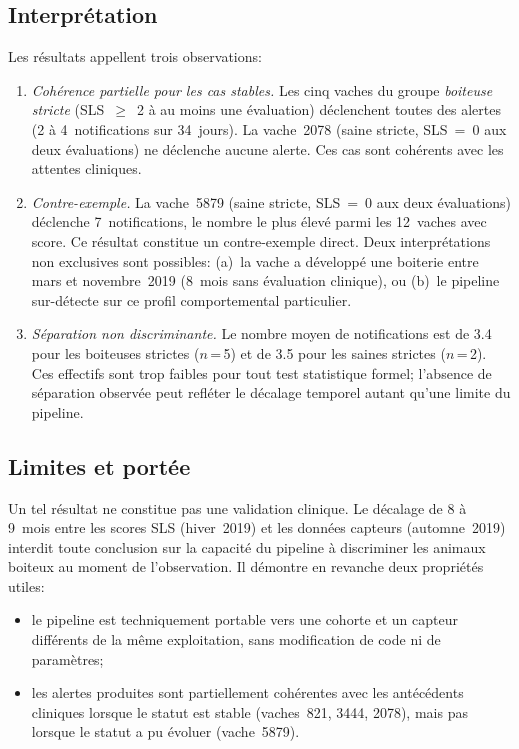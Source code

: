 \subsection{Interprétation}

Les résultats appellent trois observations:

\begin{enumerate}
    \item \textit{Cohérence partielle pour les cas stables.}
    Les cinq vaches du groupe \textit{boiteuse stricte} (SLS~$\geq$~2 à au moins
    une évaluation) déclenchent toutes des alertes (2 à 4~notifications sur 34~jours).
    La vache~2078 (saine stricte, SLS~=~0 aux deux évaluations) ne déclenche aucune
    alerte. Ces cas sont cohérents avec les attentes cliniques.

    \item \textit{Contre-exemple.}
    La vache~5879 (saine stricte, SLS~=~0 aux deux évaluations) déclenche
    7~notifications, le nombre le plus élevé parmi les 12~vaches avec score.
    Ce résultat constitue un contre-exemple direct. Deux interprétations non
    exclusives sont possibles: (a)~la vache a développé une boiterie entre mars
    et novembre~2019 (8~mois sans évaluation clinique), ou (b)~le pipeline
    sur-détecte sur ce profil comportemental particulier.

    \item \textit{Séparation non discriminante.}
    Le nombre moyen de notifications est de 3.4 pour les boiteuses strictes
    ($n$\,=\,5) et de 3.5 pour les saines strictes ($n$\,=\,2). Ces effectifs
    sont trop faibles pour tout test statistique formel; l'absence de séparation
    observée peut refléter le décalage temporel autant qu'une limite du pipeline.
\end{enumerate}

\subsection{Limites et portée}

Un tel résultat ne constitue pas une validation clinique. Le décalage de 8 à 9~mois
entre les scores SLS (hiver~2019) et les données capteurs (automne~2019) interdit
toute conclusion sur la capacité du pipeline à discriminer les animaux boiteux au
moment de l'observation. Il démontre en revanche deux propriétés utiles:
\begin{itemize}
    \item le pipeline est techniquement portable vers une cohorte et un
    capteur différents de la même exploitation, sans modification de code ni de
    paramètres;
    \item les alertes produites sont partiellement cohérentes avec les
    antécédents cliniques lorsque le statut est stable (vaches~821, 3444, 2078),
    mais pas lorsque le statut a pu évoluer (vache~5879).
\end{itemize}

